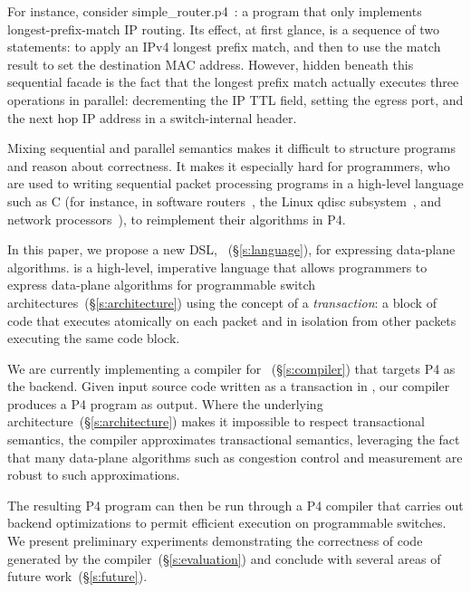 For instance, consider simple\_router.p4~\cite{simple_router.p4}: a program
that only implements longest-prefix-match IP routing. Its effect, at first glance,
is a sequence of two statements: to apply an IPv4 longest prefix match, and
then to use the match result  to set the destination MAC address. However,
hidden beneath this sequential facade is the fact that the longest prefix match
actually executes three operations in parallel: decrementing the IP TTL field,
setting the egress port, and the next hop IP address in a switch-internal
header.

Mixing sequential and parallel semantics makes it difficult to structure
programs and reason about correctness. It makes it especially hard for
programmers, who are used to writing sequential packet processing programs in a
high-level language such as C (for instance, in software routers~\cite{click,
intel_multicore}, the Linux qdisc subsystem~\cite{qdisc}, and network
processors~\cite{npu}), to reimplement their algorithms in P4.

In this paper, we propose a new DSL, \pktlanguage~(\S\ref{s:language}), for
expressing data-plane algorithms. \pktlanguage is a high-level, imperative
language that allows programmers to express data-plane algorithms for
programmable switch architectures~(\S\ref{s:architecture}) using the concept of
a {\em transaction}: a block of code that executes atomically on each packet
and in isolation from other packets executing the same code block.

We are currently implementing a compiler for \pktlanguage~(\S\ref{s:compiler})
that targets P4 as the backend. Given input source code written as a
transaction in \pktlanguage, our compiler produces a P4 program as output.
Where the underlying architecture~(\S\ref{s:architecture}) makes it impossible
to respect transactional semantics, the compiler approximates transactional
semantics, leveraging the fact that many data-plane algorithms such as
congestion control and measurement are robust to such approximations.

The resulting P4 program can then be run through a P4 compiler that carries out
backend optimizations to permit efficient execution on programmable switches.
We present preliminary experiments demonstrating the correctness of code
generated by the compiler~(\S\ref{s:evaluation}) and conclude with several
areas of future work~(\S\ref{s:future}).
